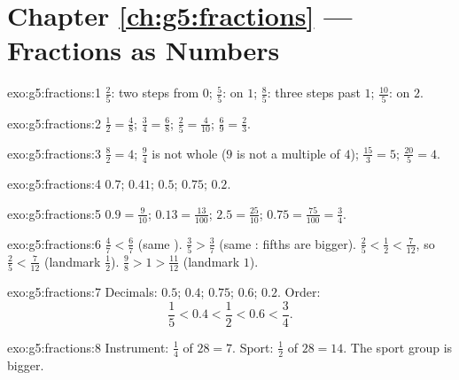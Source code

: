 \section*{Chapter \ref{ch:g5:fractions} --- Fractions as Numbers}

\begin{solution}{exo:g5:fractions:1}
$\frac25$: two steps from $0$; $\frac55$: on $1$; $\frac85$: three
steps past $1$; $\frac{10}{5}$: on $2$.
\end{solution}

\begin{solution}{exo:g5:fractions:2}
$\frac12 = \frac48$; \quad $\frac34 = \frac68$; \quad
$\frac25 = \frac{4}{10}$; \quad $\frac69 = \frac23$.
\end{solution}

\begin{solution}{exo:g5:fractions:3}
$\frac82 = 4$; \quad $\frac94$ is not whole ($9$ is not a multiple
of $4$); \quad $\frac{15}{3} = 5$; \quad $\frac{20}{5} = 4$.
\end{solution}

\begin{solution}{exo:g5:fractions:4}
$0.7$; \quad $0.41$; \quad $0.5$; \quad $0.75$; \quad $0.2$.
\end{solution}

\begin{solution}{exo:g5:fractions:5}
$0.9 = \frac{9}{10}$; \quad $0.13 = \frac{13}{100}$; \quad
$2.5 = \frac{25}{10}$; \quad $0.75 = \frac{75}{100} = \frac34$.
\end{solution}

\begin{solution}{exo:g5:fractions:6}
$\frac47 < \frac67$ (same ). \quad
$\frac35 > \frac37$ (same : fifths are bigger). \quad
$\frac25 < \frac12 < \frac{7}{12}$, so $\frac25 < \frac{7}{12}$
(landmark $\frac12$). \quad
$\frac98 > 1 > \frac{11}{12}$ (landmark $1$).
\end{solution}

\begin{solution}{exo:g5:fractions:7}
Decimals: $0.5$; $0.4$; $0.75$; $0.6$; $0.2$. Order:
\[
\frac15 < 0.4 < \frac12 < 0.6 < \frac34 .
\]
\end{solution}

\begin{solution}{exo:g5:fractions:8}
Instrument: $\frac14$ of $28 = 7$. Sport: $\frac12$ of $28 = 14$.
The sport group is bigger.
\end{solution}

